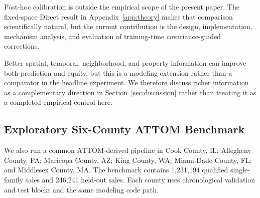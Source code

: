 \documentclass[10pt]{article}
\theoremstyle{definition}
\newcommand{\1}{\mathbf{1}}
\newcommand{\oldtext}[1]{\textcolor{blue}{\sout{#1}}}
\newcommand{\newtext}[1]{\textcolor{impGreen}{#1}}
\begin{document}
\newtext{Post-hoc calibration is outside the empirical scope of the present paper. The fixed-space Direct result in Appendix~\ref{app:theory} makes that comparison scientifically natural, but the current contribution is the design, implementation, mechanism analysis, and evaluation of training-time covariance-guided corrections.}


\textcolor{impGreen}{Better spatial, temporal, neighborhood, and property information can improve both prediction and equity, but this is a modeling extension rather than a comparator in the headline experiment. We therefore discuss richer information as a complementary direction in Section~\ref{sec:discussion} rather than treating it as a completed empirical control here.}


\subsection{Exploratory Six-County ATTOM Benchmark}
\label{subsec:attom_design}

We also run a common ATTOM-derived pipeline in Cook County, IL; Allegheny County, PA; Maricopa County, AZ; King County, WA; Miami-Dade County, FL; and Middlesex County, MA. The benchmark contains 1,231,194 qualified single-family sales and 246,241 held-out sales. Each county uses chronological validation and test blocks and the same modeling code path.
\end{document}
